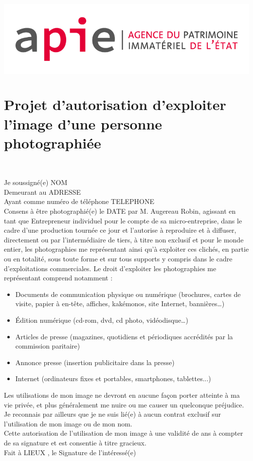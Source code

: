 \documentclass{article}
\begin{document}
\begin{center}
\includegraphics[scale=0.4]{apie.png}
\end{center}

\section*{Projet d’autorisation d’exploiter l’image d’une personne photographiée}
\begin{center}
 \\
\end{center}

Je soussigné(e)  NOM \\
Demeurant au   ADRESSE \\
Ayant comme numéro de téléphone     TELEPHONE \\

Consens à être photographié(e) le DATE par M. Augereau Robin, agissant en tant que Entrepreneur individuel pour le compte de sa micro-entreprise, dans le cadre d’une production tournée ce jour
et l'autorise  à reproduire et à diffuser, directement ou par l’intermédiaire de tiers, à titre non exclusif et pour le monde entier, les photographies me représentant ainsi qu’à exploiter ces clichés, en partie ou en totalité, sous toute forme et sur tous supports y compris dans le cadre d’exploitations commerciales.
Le droit d’exploiter les photographies me représentant comprend notamment : 
\begin{itemize}
 \item Documents de communication physique ou numérique (brochures, cartes de visite, papier à en-tête, affiches, kakémonos, site Internet, bannières…)
 \item Édition numérique (cd-rom, dvd, cd photo, vidéodisque…)
 \item Articles de presse (magazines, quotidiens et périodiques accrédités par la commission paritaire)
 \item Annonce presse (insertion publicitaire dans la presse)
 \item	Internet (ordinateurs fixes et portables, smartphones, tablettes...)
\end{itemize}

Les utilisations de mon image ne devront en aucune façon porter atteinte à ma vie privée, et plus généralement me nuire ou me causer un quelconque préjudice.
Je reconnais par ailleurs que je ne suis lié(e) à aucun contrat exclusif sur l’utilisation de mon image ou de mon nom. \\
Cette autorisation de l’utilisation de mon image à une validité de       ans à compter de sa signature et est consentie à titre gracieux.\\

Fait à  LIEUX , le 
Signature de l’intéressé(e)
\end{document}
